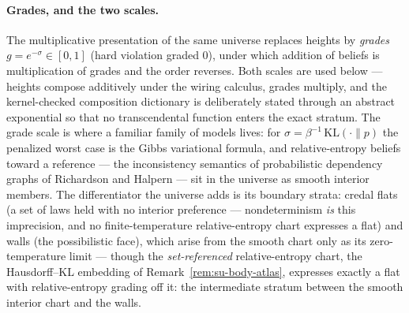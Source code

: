 \paragraph{Grades, and the two scales.} The multiplicative
presentation of the same universe replaces heights by \emph{grades}
$g = e^{-\sigma} \in [0,1]$ (hard violation graded $0$), under which
addition of beliefs is multiplication of grades and the
order reverses. Both scales are used below --- heights compose
additively under the wiring calculus, grades multiply, and the
kernel-checked composition dictionary is deliberately stated through
an abstract exponential so that no transcendental function enters the
exact stratum. The grade scale is where a familiar family of models
lives: for $\sigma = \beta^{-1}\,\mathrm{KL}(\cdot \| p)$ the
penalized worst case is the Gibbs variational formula, and
relative-entropy beliefs toward a reference --- the inconsistency
semantics of probabilistic dependency graphs of Richardson and
Halpern \cite{richardson20} --- sit in the universe as smooth
interior members. The differentiator the universe adds is its
boundary strata: credal flats (a set of laws held with no interior
preference --- nondeterminism \emph{is} this imprecision, and no
finite-temperature relative-entropy chart expresses a flat) and
walls (the possibilistic face), which arise from the smooth chart
only as its zero-temperature limit --- though the
\emph{set-referenced} relative-entropy chart, the Hausdorff--KL
embedding of Remark~\ref{rem:su-body-atlas}, expresses exactly a
flat with relative-entropy grading off it: the intermediate
stratum between the smooth interior chart and the walls.

